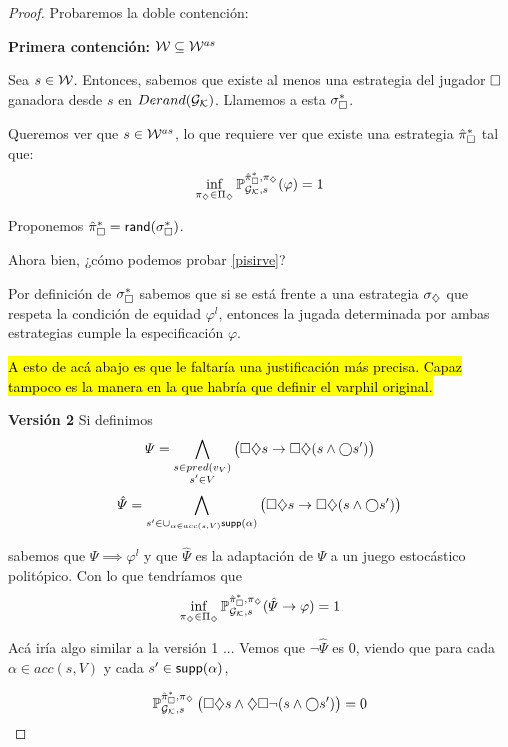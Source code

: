 \begin{proof}
	Probaremos la doble contención:

	\textbf{Primera contención: } $\mathcal{W} \subseteq \mathcal{W}^{as}$

	Sea $s \in \mathcal{W}$. Entonces, sabemos que existe al menos una estrategia del
	jugador $\square$ ganadora desde $s$ en $Derand(\mathcal{G}_{\mathcal{K}})$. Llamemos a esta
	$\sigma_\square^{*}$.

	Queremos ver que $s \in \mathcal{W}^{as}$, lo que requiere ver que existe una estrategia
	$\hat{\pi}_{\square}^{*}$ tal que:
	\begin{equation}
		\label{pisirve}
		\inf_{\pi_\diamondsuit \in \Pi_\diamondsuit} \mathbb{P}_{\mathcal{G}_{\mathcal{K}},s}^{\hat{\pi}_{\square}^{*}, \pi_\diamondsuit}(\varphi) = 1
	\end{equation}

	Proponemos $\hat{\pi}_{\square}^{*} = \textsf{rand}(\sigma_\square^*)$.

	Ahora bien, ¿cómo podemos probar \ref{pisirve}?

	Por definición de $\sigma_\square^*$ sabemos que si se está frente a una
	estrategia $\sigma_\diamondsuit$ que respeta la condición de equidad $\varphi^l$,
	entonces la jugada determinada por ambas estrategias cumple la especificación
	$\varphi$.

	\hl{A esto de acá abajo es que le faltaría una justificación más precisa. Capaz tampoco es la manera en la que habría que definir el varphil original.}

	\textbf{Versión 2}
	Si definimos
	$$ \varPsi = \bigwedge_{\substack{s \in pred(v_V) \\ s' \in V}}  \left( \square \diamondsuit s \rightarrow \square \diamondsuit (s \wedge \bigcirc s' ) \right)$$
	$$ \hat \varPsi = \bigwedge_{s' \in \cup_{\alpha \in acc(s, V)} \textsf{supp}(\alpha)}  \left( \square \diamondsuit s \rightarrow \square \diamondsuit (s \wedge \bigcirc s' ) \right)$$

	sabemos que $\varPsi \implies \varphi^l$ y que $\hat \varPsi$ es la adaptación
	de $\varPsi$ a un juego estocástico politópico. Con lo que tendríamos que
	\begin{equation}
		\label{implicancia2}
		\inf_{\pi_\diamondsuit \in \Pi_\diamondsuit} \mathbb{P}_{\mathcal{G}_{\mathcal{K}},s}^{\hat{\pi}_{\square}^{*}, \pi_\diamondsuit}(\hat{\varPsi} \rightarrow \varphi) = 1
	\end{equation}

	Acá iría algo similar a la versión 1 ... Vemos que $\neg \hat{\varPsi}$ es 0,
	viendo que para cada $\alpha \in acc(s, V)$ y cada $s' \in \textsf{supp}(\alpha)$,

	$$
		\mathbb{P}_{\mathcal{G}_{\mathcal{K}}, s}^{\hat{\pi}_{\square}^{*}, \pi_\diamondsuit} \left( \square \diamondsuit s \wedge \diamondsuit \square \neg (s \wedge \bigcirc s' ) \right) = 0
	$$


\end{proof}
